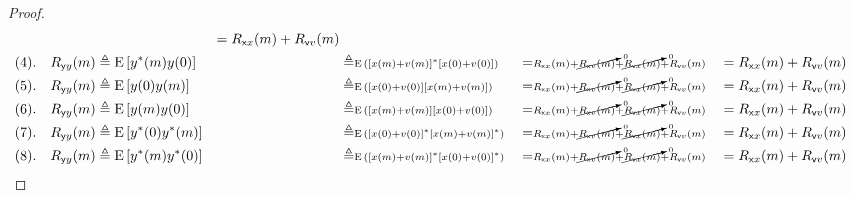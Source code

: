 \begin{proof}
\begin{align*}
       &&=    R_{{\mathsf xx}}(m)                                                 + R_{{\mathsf vv}}(m)
    \\
    (4).\quad R_{{\mathsf yy}}(m)
        &\triangleq \operatorname{E}{\left[y^\ast(m)y(0)\right]}
       &&\triangleq \scriptstyle \operatorname{E}{\left({\left[x(m)+v(m)\right]}^\ast{\left[x(0)+v(0)\right]}\right)}
       &&=    \scriptstyle R_{{\mathsf xx}}(m) + \cancelto{0}{R_{{\mathsf xv}}(m)} + \cancelto{0}{R_{{\mathsf vx}}(m)} + R_{{\mathsf vv}}(m)
       &&=    R_{{\mathsf xx}}(m)                                                 + R_{{\mathsf vv}}(m)
    \\
    (5).\quad R_{{\mathsf yy}}(m)
        &\triangleq \operatorname{E}{\left[y(0)y(m)\right]}
       &&\triangleq \scriptstyle \operatorname{E}{\left({\left[x(0)+v(0)\right]}{\left[x(m)+v(m)\right]}\right)}
       &&=    \scriptstyle R_{{\mathsf xx}}(m) + \cancelto{0}{R_{{\mathsf xv}}(m)} + \cancelto{0}{R_{{\mathsf vx}}(m)} + R_{{\mathsf vv}}(m)
       &&=    R_{{\mathsf xx}}(m)                                                 + R_{{\mathsf vv}}(m)
    \\
    (6).\quad R_{{\mathsf yy}}(m)
        &\triangleq \operatorname{E}{\left[y(m)y(0)\right]}
       &&\triangleq \scriptstyle \operatorname{E}{\left({\left[x(m)+v(m)\right]}{\left[x(0)+v(0)\right]}\right)}
       &&=    \scriptstyle R_{{\mathsf xx}}(m) + \cancelto{0}{R_{{\mathsf xv}}(m)} + \cancelto{0}{R_{{\mathsf vx}}(m)} + R_{{\mathsf vv}}(m)
       &&=    R_{{\mathsf xx}}(m)                                                 + R_{{\mathsf vv}}(m)
    \\
    (7).\quad R_{{\mathsf yy}}(m)
       &\triangleq \operatorname{E}{\left[y^\ast(0)y^\ast(m)\right]}
       &&\triangleq \scriptstyle \operatorname{E}{\left({\left[x(0)+v(0)\right]}^\ast{\left[x(m)+v(m)\right]}^\ast\right)}
       &&=    \scriptstyle R_{{\mathsf xx}}(m) + \cancelto{0}{R_{{\mathsf xv}}(m)} + \cancelto{0}{R_{{\mathsf vx}}(m)} + R_{{\mathsf vv}}(m)
       &&=    R_{{\mathsf xx}}(m)                                                 + R_{{\mathsf vv}}(m)
    \\
    (8).\quad R_{{\mathsf yy}}(m)
       &\triangleq \operatorname{E}{\left[y^\ast(m)y^\ast(0)\right]}
       &&\triangleq \scriptstyle \operatorname{E}{\left({\left[x(m)+v(m)\right]}^\ast{\left[x(0)+v(0)\right]}^\ast\right)}
       &&=    \scriptstyle R_{{\mathsf xx}}(m) + \cancelto{0}{R_{{\mathsf xv}}(m)} + \cancelto{0}{R_{{\mathsf vx}}(m)} + R_{{\mathsf vv}}(m)
       &&=    R_{{\mathsf xx}}(m)                                                 + R_{{\mathsf vv}}(m)
\end{align*}
\end{proof}

